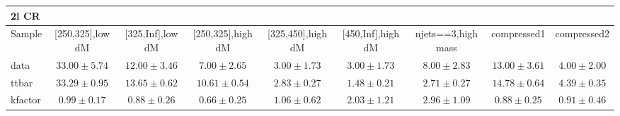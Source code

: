 \begin{table}
\begin{center}
\small
\begin{tabular}{lcccccccc}
\hline
2l CR & & & & & & & &\\
\hline
Sample&[250,325],low dM&[325,Inf],low dM&[250,325],high dM&[325,450],high dM&[450,Inf],high dM&njets==3,high mass&compressed1&compressed2\\
\hline
data&$33.00\pm5.74$&$12.00\pm3.46$&$7.00\pm2.65$&$3.00\pm1.73$&$3.00\pm1.73$&$8.00\pm2.83$&$13.00\pm3.61$&$4.00\pm2.00$\\
\hline
ttbar&$33.29\pm0.95$&$13.65\pm0.62$&$10.61\pm0.54$&$2.83\pm0.27$&$1.48\pm0.21$&$2.71\pm0.27$&$14.78\pm0.64$&$4.39\pm0.35$\\
kfactor&$0.99\pm0.17$&$0.88\pm0.26$&$0.66\pm0.25$&$1.06\pm0.62$&$2.03\pm1.21$&$2.96\pm1.09$&$0.88\pm0.25$&$0.91\pm0.46$\\
\hline\hline
\end{tabular}
\end{center}
\end{table}
